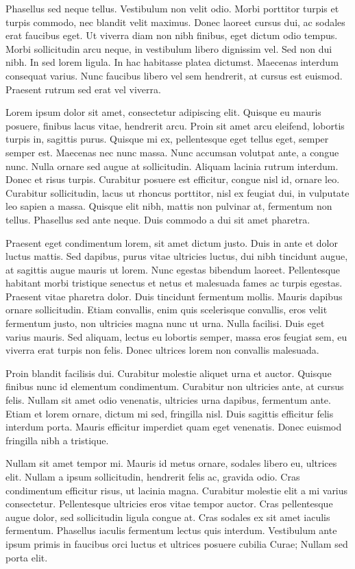 \documentclass{article}
\begin{document}
Phasellus sed neque tellus. Vestibulum non velit odio. Morbi porttitor turpis et turpis commodo, nec blandit velit maximus. Donec laoreet cursus dui, ac sodales erat faucibus eget. Ut viverra diam non nibh finibus, eget dictum odio tempus. Morbi sollicitudin arcu neque, in vestibulum libero dignissim vel. Sed non dui nibh. In sed lorem ligula. In hac habitasse platea dictumst. Maecenas interdum consequat varius. Nunc faucibus libero vel sem hendrerit, at cursus est euismod. Praesent rutrum sed erat vel viverra. 

Lorem ipsum dolor sit amet, consectetur adipiscing elit. Quisque eu mauris posuere, finibus lacus vitae, hendrerit arcu. Proin sit amet arcu eleifend, lobortis turpis in, sagittis purus. Quisque mi ex, pellentesque eget tellus eget, semper semper est. Maecenas nec nunc massa. Nunc accumsan volutpat ante, a congue nunc. Nulla ornare sed augue at sollicitudin. Aliquam lacinia rutrum interdum. Donec et risus turpis. Curabitur posuere est efficitur, congue nisl id, ornare leo. Curabitur sollicitudin, lacus ut rhoncus porttitor, nisl ex feugiat dui, in vulputate leo sapien a massa. Quisque elit nibh, mattis non pulvinar at, fermentum non tellus. Phasellus sed ante neque. Duis commodo a dui sit amet pharetra.


Praesent eget condimentum lorem, sit amet dictum justo. Duis in ante et dolor luctus mattis. Sed dapibus, purus vitae ultricies luctus, dui nibh tincidunt augue, at sagittis augue mauris ut lorem. Nunc egestas bibendum laoreet. Pellentesque habitant morbi tristique senectus et netus et malesuada fames ac turpis egestas. Praesent vitae pharetra dolor. Duis tincidunt fermentum mollis. Mauris dapibus ornare sollicitudin. Etiam convallis, enim quis scelerisque convallis, eros velit fermentum justo, non ultricies magna nunc ut urna. Nulla facilisi. Duis eget varius mauris. Sed aliquam, lectus eu lobortis semper, massa eros feugiat sem, eu viverra erat turpis non felis. Donec ultrices lorem non convallis malesuada.


Proin blandit facilisis dui. Curabitur molestie aliquet urna et auctor. Quisque finibus nunc id elementum condimentum. Curabitur non ultricies ante, at cursus felis. Nullam sit amet odio venenatis, ultricies urna dapibus, fermentum ante. Etiam et lorem ornare, dictum mi sed, fringilla nisl. Duis sagittis efficitur felis interdum porta. Mauris efficitur imperdiet quam eget venenatis. Donec euismod fringilla nibh a tristique.

Nullam sit amet tempor mi. Mauris id metus ornare, sodales libero eu, ultrices elit. Nullam a ipsum sollicitudin, hendrerit felis ac, gravida odio. Cras condimentum efficitur risus, ut lacinia magna. Curabitur molestie elit a mi varius consectetur. Pellentesque ultricies eros vitae tempor auctor. Cras pellentesque augue dolor, sed sollicitudin ligula congue at. Cras sodales ex sit amet iaculis fermentum. Phasellus iaculis fermentum lectus quis interdum. Vestibulum ante ipsum primis in faucibus orci luctus et ultrices posuere cubilia Curae; Nullam sed porta elit.
\end{document}
